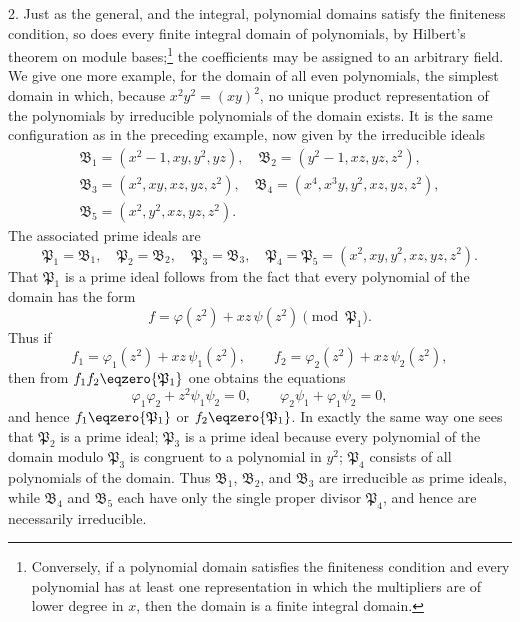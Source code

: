 \documentclass[11pt]{article}
\newcommand{\ideal}[1]{\mathfrak{#1}}
\begin{document}
2. Just as the general, and the integral, polynomial domains satisfy the finiteness condition, so does every finite integral domain of polynomials, by Hilbert's theorem on module bases;\footnote{Conversely, if a polynomial domain satisfies the finiteness condition and every polynomial has at least one representation in which the multipliers are of lower degree in $x$, then the domain is a finite integral domain.} the coefficients may be assigned to an arbitrary field. We give one more example, for the domain of all even polynomials, the simplest domain in which, because $x^2y^2=(xy)^2$, no unique product representation of the polynomials by irreducible polynomials of the domain exists. It is the same configuration as in the preceding example, now given by the irreducible ideals
\[
\begin{gathered}
 \ideal B_1=(x^2-1,xy,y^2,yz),\quad
 \ideal B_2=(y^2-1,xz,yz,z^2),\\
 \ideal B_3=(x^2,xy,xz,yz,z^2),\quad
 \ideal B_4=(x^4,x^3y,y^2,xz,yz,z^2),\\
 \ideal B_5=(x^2,y^2,xz,yz,z^2).
\end{gathered}
\]
The associated prime ideals are
\[
 \ideal P_1=\ideal B_1,
 \quad \ideal P_2=\ideal B_2,
 \quad \ideal P_3=\ideal B_3,
 \quad \ideal P_4=\ideal P_5=(x^2,xy,y^2,xz,yz,z^2).
\]
That $\ideal P_1$ is a prime ideal follows from the fact that every polynomial of the domain has the form
\[
 f=\varphi(z^2)+xz\,\psi(z^2)\pmod{\ideal P_1}.
\]
Thus if
\[
 f_1=\varphi_1(z^2)+xz\,\psi_1(z^2),
 \qquad
 f_2=\varphi_2(z^2)+xz\,\psi_2(z^2),
\]
then from $f_1f_2\eqzero{\ideal P_1}$ one obtains the equations
\[
 \varphi_1\varphi_2+z^2\psi_1\psi_2=0,
 \qquad
 \varphi_2\psi_1+\varphi_1\psi_2=0,
\]
and hence $f_1\eqzero{\ideal P_1}$ or $f_2\eqzero{\ideal P_1}$. In exactly the same way one sees that $\ideal P_2$ is a prime ideal; $\ideal P_3$ is a prime ideal because every polynomial of the domain modulo $\ideal P_3$ is congruent to a polynomial in $y^2$; $\ideal P_4$ consists of all polynomials of the domain. Thus $\ideal B_1$, $\ideal B_2$, and $\ideal B_3$ are irreducible as prime ideals, while $\ideal B_4$ and $\ideal B_5$ each have only the single proper divisor $\ideal P_4$, and hence are necessarily irreducible.
\end{document}
